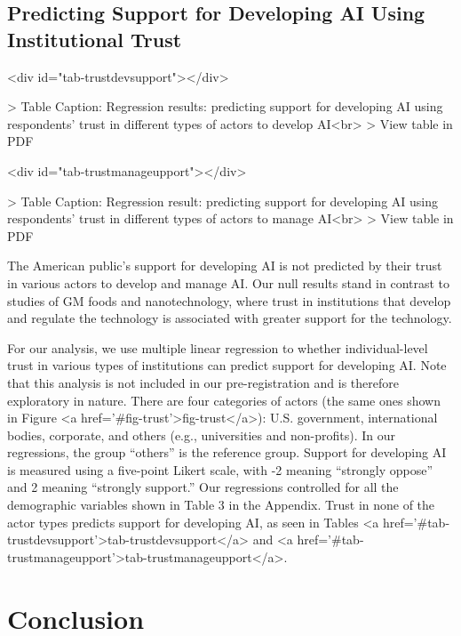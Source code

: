 \documentclass{article}
\begin{document}
\subsection{Predicting Support for Developing AI Using Institutional Trust}

\begin{table}<div id="tab-trustdevsupport"></div>

> Table Caption: Regression results: predicting support for developing AI using respondents' trust in different types of actors to develop AI<br>
> View table in PDF
\end{table} 

\begin{table}<div id="tab-trustmanageupport"></div>

> Table Caption: Regression result: predicting support for developing AI using respondents' trust in different types of actors to manage AI<br>
> View table in PDF
\end{table} 

The American public's support for developing AI is not predicted by their trust in various actors to develop and manage AI. Our null results stand in contrast to studies of GM foods and nanotechnology, where trust in institutions that develop and regulate the technology is associated with greater support for the technology. 

For our analysis, we use multiple linear regression to whether individual-level trust in various types of institutions can predict support for developing AI. Note that this analysis is not included in our pre-registration and is therefore exploratory in nature. There are four categories of actors (the same ones shown in Figure <a href='#fig-trust'>fig-trust</a>): U.S. government, international bodies, corporate, and others (e.g., universities and non-profits). In our regressions, the group ``others'' is the reference group. Support for developing AI is measured using a five-point Likert scale, with -2 meaning ``strongly oppose'' and 2 meaning ``strongly support.'' Our regressions controlled for all the demographic variables shown in Table 3 in the Appendix. Trust in none of the actor types predicts support for developing AI, as seen in Tables <a href='#tab-trustdevsupport'>tab-trustdevsupport</a> and <a href='#tab-trustmanageupport'>tab-trustmanageupport</a>.

\section{Conclusion}
\end{document}
